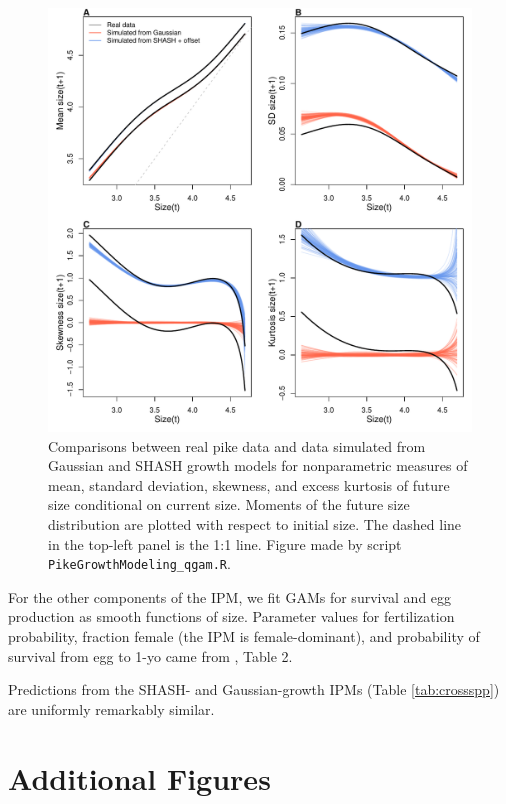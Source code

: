 \documentclass[12pt]{article}
\begin{document}
\begin{spacing}{1.35}
\begin{figure}[tbp]
	\centering
	\includegraphics[width=1.0\textwidth]{figures/pike_SHASH_fit.pdf}
	\caption{Comparisons between real pike data and data simulated from Gaussian and SHASH growth models for nonparametric measures of mean, standard deviation, 
	skewness, and excess kurtosis of future size conditional on current size. 
		Moments of the future size distribution are plotted with respect to initial size. The dashed line in the top-left panel is the 1:1 line. 
		Figure made by script \texttt{PikeGrowthModeling\_qgam.R}.}
	\label{fig:pikeSims}
\end{figure} 

For the other components of the IPM, we fit GAMs for survival and egg production as smooth functions of size. 
Parameter values for fertilization probability, fraction female (the IPM is female-dominant), and probability of survival from egg to 1-yo 
came from \cite{stubberud2019effects}, Table 2. 

Predictions from the SHASH- and Gaussian-growth IPMs (Table \ref{tab:crossspp}) are uniformly remarkably similar. 

\clearpage 
 
\section{Additional Figures}
\label{sec:additionalFigs}
 

\end{spacing}
\end{document}
